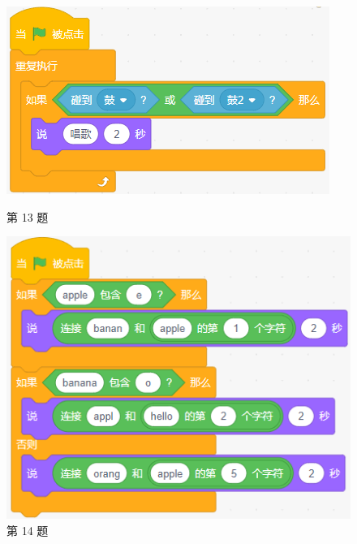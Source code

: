 \documentclass[10pt, a4paper]{article}
\begin{document}
\begin{enumerate}
        \begin{figure}[htbp]
            \centering
            \begin{minipage}[t]{.23\textwidth}
                \centering
                \includegraphics[width=\textwidth]{figure/13.png}
                \caption*{第 13 题}
            \end{minipage}
            \begin{minipage}[t]{.25\textwidth}
                \centering
                \includegraphics[width=\textwidth]{figure/14.png}
                \caption*{第 14 题}
            \end{minipage}
            \begin{minipage}[t]{.2\textwidth}
                \centering

\end{minipage}
\end{figure}
\end{enumerate}
\end{document}

